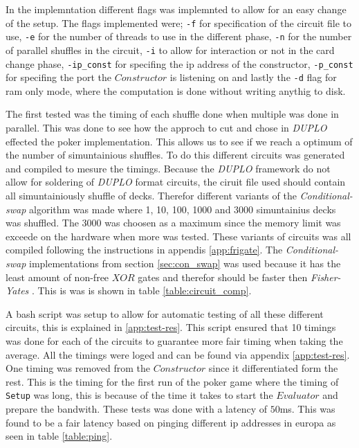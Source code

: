 \documentclass[twoside,11pt,openright]{report}
\newcommand{\FY}{\textit{Fisher-Yates} }
\newcommand{\CS}{\textit{Conditional-swap} }
\newcommand{\DUPLO}{\textit{DUPLO} }
\begin{document}
In the implemntation different flags was implemnted to allow for an easy change of the setup. The flags implemented were; \verb|-f| for specification of the circuit file to use, \verb|-e| for the number of threads to use in the different phase, \verb|-n| for the number of parallel shuffles in the circuit, \verb|-i| to allow for interaction or not in the card change phase, \verb|-ip_const| for specifing the ip address of the constructor, \verb|-p_const| for specifing the port the $Constructor$ is listening on and lastly the \verb|-d| flag for ram only mode, where the computation is done without writing anythig to disk.

\bigskip

The first tested was the timing of each shuffle done when multiple was done in parallel. This was done to see how the approch to cut and chose in \DUPLO effected the poker implementation. This allows us to see if we reach a optimum of the number of simuntainious shuffles. To do this different circuits was generated and compiled to mesure the timings. Because the \DUPLO framework do not allow for soldering of \DUPLO format circuits, the ciruit file used should contain all simuntainiously shuffle of decks. Therefor different variants of the \CS algorithm was made where 1, 10, 100, 1000 and 3000 simuntainius decks was shuffled. The 3000 was choosen as a maximum since the memory limit was exceede on the hardware when more was tested. These variants of circuits was all compiled following the instructions in appendis \ref{app:frigate}. The \CS implementations from section \ref{sec:con_swap} was used because it has the least amount of non-free $XOR$ gates and therefor should be faster then \FY . This is was is shown in table \ref{table:circuit_comp}.

A bash script was setup to allow for automatic testing of all these different circuits, this is explained in \ref{app:test-res}. This script ensured that 10 timings was done for each of the circuits to guarantee more fair timing when taking the average. All the timings were loged and can be found via appendix \ref{app:test-res}. One timing was removed from the $Constructor$ since it differentiated form the rest. This is the timing for the first run of the poker game where the timing of \verb|Setup| was long, this is because of the time it takes to start the $Evaluator$ and prepare the bandwith. These tests was done with a latency of $50$ms. This was found to be a fair latency based on pinging different ip addresses in europa as seen in table \ref{table:ping}. 
\end{document}
